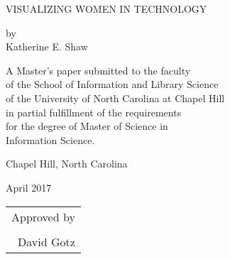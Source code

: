 \documentclass{article}
\newcommand{\bigmargins}{\vspace*{0.5in}}
\newcommand{\mytitle}{Visualizing Women in Technology}
\begin{document}
\bigmargins
\thispagestyle{empty}
\begin{center}
\MakeUppercase{\mytitle}

\vspace{1in} %
{\singlespace by\\Katherine E. Shaw

}

\vspace{1in} %
{\singlespace
  A Master's paper submitted to the faculty\\
  of the School of Information and Library Science\\
  of the University of North Carolina at Chapel Hill\\
  in partial fulfillment of the requirements\\
  for the degree of Master of Science in\\
  Information Science.

}

\vspace{1in} %
Chapel Hill, North Carolina

April 2017

\vspace{1in} %
\hfill\begin{tabular}{@{}p{3.25in}@{}}
Approved by \\

\\
\hline \multicolumn{1}{r}{David Gotz}
\end{tabular}

\end{center}
\clearpage

\bigmargins
\setcounter{page}{1}
\tableofcontents
\clearpage


\bigmargins










\clearpage
\bigmargins


\end{document}
